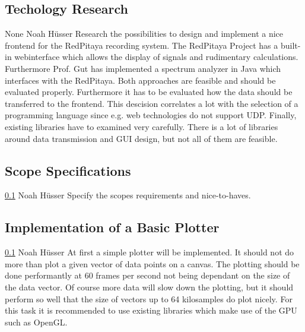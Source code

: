 \documentclass[a4paper,oneside]{alpenspecs/alpenspecs}
\begin{document}
\subsection{Techology Research}
\label{subsec:frontend:research}
\wpac
    {}
    {}
    {}
    {None}
    {}
    {Noah Hüsser}
    {%
        Research the possibilities to design and implement a nice frontend for the RedPitaya recording system.
        The RedPitaya Project has a built-in webinterface which allows the display of signals and rudimentary calculations.
        Furthermore Prof. Gut has implemented a spectrum analyzer in Java which interfaces with the RedPitaya.
        Both approaches are feasible and should be evaluated properly.
        Furthermore it has to be evaluated how the data should be transferred to the frontend.
        This descision correlates a lot with the selection of a programming language since e.g. web technologies do not support UDP.
        Finally, existing libraries have to examined very carefully. There is a lot of libraries around data transmission and GUI design, but not all of them are feasible.
    }

\subsection{Scope Specifications}
\label{subsec:frontend:specify}
\wpac
    {}
    {}
    {}
    {\ref{subsec:frontend:research}}
    {}
    {Noah Hüsser}
    {%
        Specify the scopes requirements and nice-to-haves.
    }

\subsection{Implementation of a Basic Plotter}
\label{subsec:frontend:plotter}
\wpac
    {}
    {}
    {}
    {\ref{subsec:frontend:research}}
    {}
    {Noah Hüsser}
    {%
        At first a simple plotter will be implemented. It should not do more than plot a given vector of data points on a canvas.
        The plotting should be done performantly at 60 frames per second not being dependant on the size of the data vector.
        Of course more data will slow down the plotting, but it should perform so well that the size of vectors up to 64 kilosamples do plot nicely.
        For this task it is recommended to use existing libraries which make use of the GPU such as OpenGL.
    }
\end{document}
